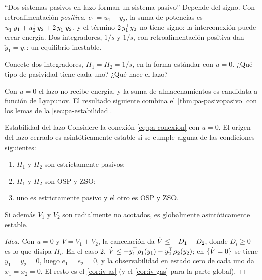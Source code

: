 \begin{trampa}[label=tr:pa-signo]{``Dos sistemas pasivos en lazo forman un sistema pasivo''}
Depende del signo. Con retroalimentación \emph{positiva}, $e_1=u_1+y_2$, la suma de potencias es $u_1^{\top} y_1+u_2^{\top} y_2+2\,y_1^{\top} y_2$, y el término $2\,y_1^{\top} y_2$ no tiene signo: la interconexión puede crear energía. Dos integradores, $1/s$ y $1/s$, con retroalimentación positiva dan $\ddot y_1=y_1$: un equilibrio inestable.
\end{trampa}

\begin{pausa}
Conecte dos integradores, $H_1=H_2=1/s$, en la forma estándar con $u=0$. ¿Qué tipo de pasividad tiene cada uno? ¿Qué hace el lazo?
\end{pausa}

Con $u=0$ el lazo no recibe energía, y la suma de almacenamientos es candidata a función de Lyapunov. El resultado siguiente combina el \cref{thm:pa-pasivopasivo} con los lemas de la \cref{sec:pa-estabilidad}.

\begin{teorema}[label=thm:pa-lazoAS]{Estabilidad del lazo \citep[Teo.~6.3]{Kha02}}
Considere la conexión \eqref{eq:pa-conexion} con $u=0$. El origen del lazo cerrado es asintóticamente estable si se cumple alguna de las condiciones siguientes:
\begin{enumerate}
  \item $H_1$ y $H_2$ son estrictamente pasivos;
  \item $H_1$ y $H_2$ son OSP y ZSO;
  \item uno es estrictamente pasivo y el otro es OSP y ZSO.
\end{enumerate}
Si además $V_1$ y $V_2$ son radialmente no acotados, es globalmente asintóticamente estable.
\end{teorema}

\begin{proof}[Idea]
Con $u=0$ y $V=V_1+V_2$, la cancelación da $\dot V\le-D_1-D_2$, donde $D_i\ge0$ es lo que disipa $H_i$. En el caso 2, $\dot V\le-y_1^{\top}\rho_1(y_1)-y_2^{\top}\rho_2(y_2)$; en $\{\dot V=0\}$ se tiene $y_1=y_2=0$, luego $e_1=e_2=0$, y la observabilidad en estado cero de cada uno da $x_1=x_2=0$. El resto es el \cref{cor:iv-as} (y el \cref{cor:iv-gas} para la parte global).
\end{proof}

